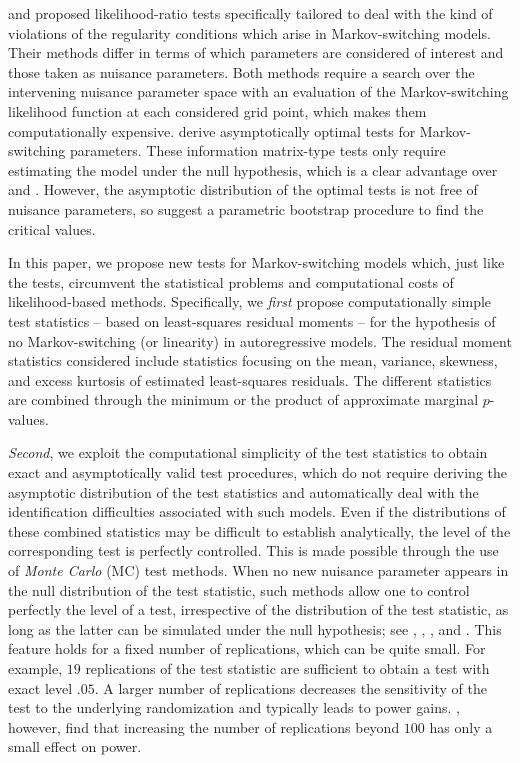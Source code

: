 \documentclass[11pt]{article}
\begin{document}
\citet{Hansen:1992, Hansen:1996} and \citet{Garcia:1998} proposed
likelihood-ratio tests specifically tailored to deal with the kind of
violations of the regularity conditions which arise in Markov-switching
models. Their methods differ in terms of which parameters are considered of
interest and those taken as nuisance parameters. Both methods require a
search over the intervening nuisance parameter space with an evaluation of
the Markov-switching likelihood function at each considered grid point,
which makes them computationally expensive. %
\citet{Carrasco-Hu-Ploberger:2014} derive asymptotically optimal tests for
Markov-switching parameters. These information matrix-type tests only
require estimating the model under the null hypothesis, which is a clear
advantage over \citet{Hansen:1992, Hansen:1996} and \citet{Garcia:1998}.
However, the asymptotic distribution of the optimal tests is not free of
nuisance parameters, so \citet{Carrasco-Hu-Ploberger:2014} suggest a
parametric bootstrap procedure to find the critical values.

In this paper, we propose new tests for Markov-switching models which, just
like the \citet{Carrasco-Hu-Ploberger:2014} tests, circumvent the
statistical problems and computational costs of likelihood-based methods.
Specifically, we \emph{first} propose computationally simple test statistics
-- based on least-squares residual moments -- for the hypothesis of no
Markov-switching (or linearity) in autoregressive models. The residual
moment statistics considered include statistics focusing on the mean,
variance, skewness, and excess kurtosis of estimated least-squares
residuals. The different statistics are combined through the minimum or the
product of approximate marginal $p$-values.

\emph{Second}, we exploit the computational simplicity of the test
statistics to obtain exact and asymptotically valid test procedures, which
do not require deriving the asymptotic distribution of the test statistics
and automatically deal with the identification difficulties associated with
such models. Even if the distributions of these combined statistics may be
difficult to establish analytically, the level of the corresponding test is
perfectly controlled. This is made possible through the use of \emph{Monte
Carlo} (MC) test methods. When no new nuisance parameter appears in the null
distribution of the test statistic, such methods allow one to control
perfectly the level of a test, irrespective of the distribution of the test
statistic, as long as the latter can be simulated under the null hypothesis;
see {\citet{Dwass:1957}, \citet{Barnard:1963}, \citet{Birnbaum:1974}, and %
\citet{Dufour:2006}. This feature holds for a fixed number of replications,
which can be quite small. For example, $19$ replications of the test
statistic are sufficient to obtain a test with exact level ${.05}$. A larger
number of replications decreases the sensitivity of the test to the
underlying randomization and typically leads to power gains. %
\citet{Dufour-Khalaf-Bernard-Genest:2004}, however, find that increasing the
number of replications beyond $100$ has only a small effect on power. }
\end{document}
